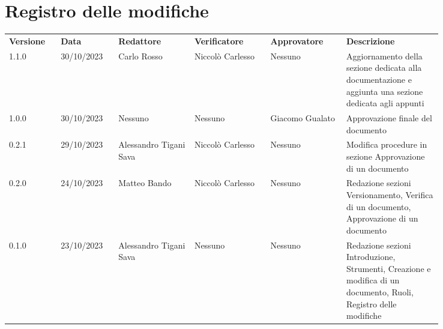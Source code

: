 \section*{Registro delle modifiche}
 {
  \scriptsize
  \begin{tabular}{p{0.10\linewidth}p{0.10\linewidth}p{0.15\linewidth}p{0.15\linewidth}p{0.15\linewidth}p{0.19\linewidth}}
	  \textbf{Versione} & \textbf{Data} & \textbf{Redattore}     & \textbf{Verificatore} & \textbf{Approvatore} & \textbf{Descrizione}                                                                                             \\
	  1.1.0             & 30/10/2023    & Carlo Rosso            & Niccolò Carlesso      & Nessuno              & Aggiornamento della sezione dedicata alla documentazione e aggiunta una sezione dedicata agli appunti            \\
	  \hline
	  1.0.0             & 30/10/2023    & Nessuno                & Nessuno               & Giacomo Gualato      & Approvazione finale del documento                                                                                \\
	  \hline
	  0.2.1             & 29/10/2023    & Alessandro Tigani Sava & Niccolò Carlesso      & Nessuno              & Modifica procedure in sezione Approvazione di un documento                                                       \\
	  \hline
	  0.2.0             & 24/10/2023    & Matteo Bando           & Niccolò Carlesso      & Nessuno              & Redazione sezioni Versionamento, Verifica di un documento, Approvazione di un documento                          \\
	  \hline
	  0.1.0             & 23/10/2023    & Alessandro Tigani Sava & Nessuno               & Nessuno              & Redazione sezioni Introduzione, Strumenti, Creazione e modifica di un documento, Ruoli, Registro delle modifiche \\
	  \hline
  \end{tabular}
 }
